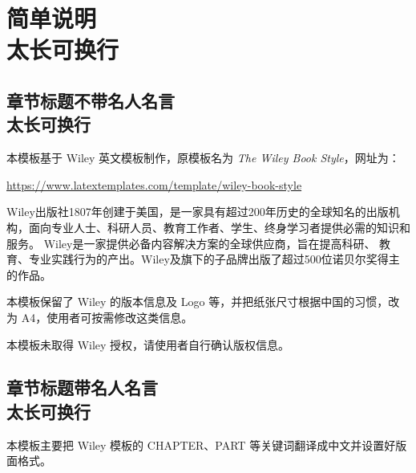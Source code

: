 \documentclass{WileySev}
\begin{document}


\part[简单说明]
{简单说明\\ 太长可换行}

\chapter[章节标题不带名人名言]
{章节标题不带名人名言 \\ 太长可换行}

本模板基于 Wiley 英文模板制作，原模板名为 \textit{The Wiley Book Style}，网址为：

\url{https://www.latextemplates.com/template/wiley-book-style}

Wiley出版社1807年创建于美国，是一家具有超过200年历史的全球知名的出版机构，面向专业人士、科研人员、教育工作者、学生、终身学习者提供必需的知识和服务。
Wiley是一家提供必备内容解决方案的全球供应商，旨在提高科研、 教育、专业实践行为的产出。Wiley及旗下的子品牌出版了超过500位诺贝尔奖得主的作品。

本模板保留了 Wiley 的版本信息及 Logo 等，并把纸张尺寸根据中国的习惯，改为 A4，使用者可按需修改这类信息。

本模板未取得 Wiley 授权，请使用者自行确认版权信息。


\chapter[章节标题带名人名言]
{章节标题带名人名言 \\ 太长可换行}

本模板主要把 Wiley 模板的 CHAPTER、PART 等关键词翻译成中文并设置好版面格式。
\end{document}
